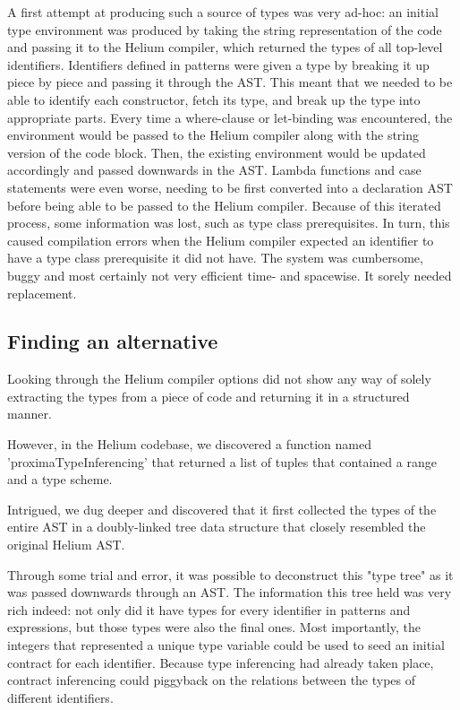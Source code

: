 \documentclass[10pt]{report}
\begin{document}
A first attempt at producing such a source of types was very ad-hoc: 
an initial type environment was produced by taking the string representation of the code and passing it to the Helium compiler, which returned the types of all top-level identifiers.
Identifiers defined in patterns were given a type by breaking it up piece by piece and passing it through the AST.
This meant that we needed to be able to identify each constructor, fetch its type, and break up the type into appropriate parts.
Every time a where-clause or let-binding was encountered, the environment would be passed to the Helium compiler along with the string version of the code block.
Then, the existing environment would be updated accordingly and passed downwards in the AST.
Lambda functions and case statements were even worse, needing to be first converted into a declaration AST before being able to be passed to the Helium compiler.
Because of this iterated process, some information was lost, such as type class prerequisites.
In turn, this caused compilation errors when the Helium compiler expected an identifier to have a type class prerequisite it did not have.
The system was cumbersome, buggy and most certainly not very efficient time- and spacewise.
It sorely needed replacement.

\subsection{Finding an alternative}
Looking through the Helium compiler options did not show any way of solely extracting the types from a piece of code and returning it in a structured manner.

However, in the Helium codebase, we discovered a function named 'proximaTypeInferencing' that returned a list of tuples that contained a range and a type scheme.

Intrigued, we dug deeper and discovered that it first collected the types of the entire AST in a doubly-linked tree data structure that closely resembled the original Helium AST.

Through some trial and error, it was possible to deconstruct this "type tree" as it was passed downwards through an AST.
The information this tree held was very rich indeed: not only did it have types for every identifier in patterns and expressions, but those types were also the final ones.
Most importantly, the integers that represented a unique type variable could be used to seed an initial contract for each identifier.
Because type inferencing had already taken place, contract inferencing could piggyback on the relations between the types of different identifiers.
\end{document}
